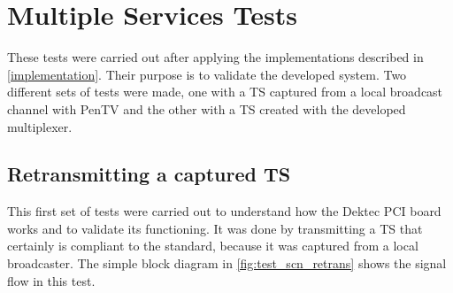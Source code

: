 \documentclass[
	12pt,				%
	openright,			%
	twoside,			%
	a4paper,			%
	brazil,
	french,				%
	english
	]{abntex2}
\begin{document}


\section{Multiple Services Tests}

These tests were carried out after applying the implementations described in \autoref{implementation}. Their purpose is to validate the developed system. Two different sets of tests were made, one with a TS captured from a local broadcast channel with PenTV and the other with a TS created with the developed multiplexer.

\subsection{Retransmitting a captured TS}
\label{retransmitting}

This first set of tests were carried out to understand how the Dektec PCI board works and to validate its functioning. It was done by transmitting a TS that certainly is compliant to the standard, because it was captured from a local broadcaster. The simple block diagram in \autoref{fig:test_scn_retrans} shows the signal flow in this test.
\end{document}
